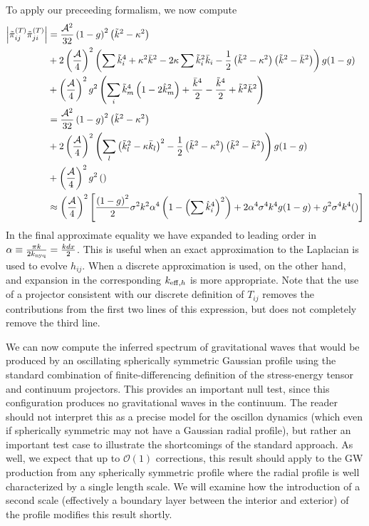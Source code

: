 \documentclass{revtex4}
\begin{document}
To apply our preceeding formalism, we now compute
\begin{align}
  \left|\tilde{\pi}^{(T)}_{ij}\tilde{\pi}_{ji}^{(T)}\right| &= \frac{\mathcal{A}^2}{32}\left(1-g\right)^2\left(\tilde{k}^2-\kappa^2\right) \notag \\
  &+ 2\left(\frac{\mathcal{A}}{4}\right)^2\left(\sum\tilde{k}_i^4 + \kappa^2\bar{k}^2 - 2\kappa\sum\tilde{k}_i^2\bar{k}_i - \frac{1}{2}\left(\tilde{k}^2-\kappa^2\right)\left(\tilde{k}^2-\bar{k}^2\right) \right)g(1-g) \\
  &+ \left(\frac{\mathcal{A}}{4}\right)^2g^2\left(\sum_i\tilde{k}_m^4\left(1-2\hat{k}_m^2\right) + \frac{\bar{k}^4}{2} - \frac{\tilde{k}^4}{2} + \tilde{k}^2\bar{k}^2\right) \notag \\
  &= \frac{\mathcal{A}^2}{32}\left(1-g\right)^2\left(\tilde{k}^2-\kappa^2\right) \notag \\
  &+ 2\left(\frac{\mathcal{A}}{4}\right)^2\left(\sum_l\left(\tilde{k}_l^2-\kappa\bar{k}_l\right)^2 - \frac{1}{2}\left(\tilde{k}^2-\kappa^2\right)\left(\tilde{k}^2-\bar{k}^2\right) \right)g(1-g) \notag \\
  &+ \left(\frac{\mathcal{A}}{4}\right)^2g^2\left(\right) \\
  &\approx \left(\frac{\mathcal{A}}{4}\right)^2\left[\frac{\left(1-g\right)^2}{2}\sigma^2k^2\alpha^4\left(1-\left(\sum\hat{k}_i^4\right)^2\right) + 2\alpha^4\sigma^4k^4g(1-g) + g^2\sigma^4k^4() \right]
\end{align}
In the final approximate equality we have expanded to leading order in $\alpha \equiv \frac{\pi k}{2k_{\rm nyq}} = \frac{kdx}{2}$.
This is useful when an exact approximation to the Laplacian is used to evolve $h_{ij}$.
When a discrete approximation is used, on the other hand, and expansion in the corresponding $k_{{\rm eff},h}$ is more appropriate. 
Note that the use of a projector consistent with our discrete definition of $T_{ij}$ removes the contributions from the first two lines of this expression, but does not completely remove the third line.

We can now compute the inferred spectrum of gravitational waves that would be produced by an oscillating spherically symmetric Gaussian profile using the standard combination of finite-differencing definition of the stress-energy tensor and continuum projectors.
This provides an important null test, since this configuration produces no gravitational waves in the continuum.
The reader should not interpret this as a precise model for the oscillon dynamics (which even if spherically symmetric may not have a Gaussian radial profile), but rather an important test case to illustrate the shortcomings of the standard approach.
As well, we expect that up to $\mathcal{O}(1)$ corrections, this result should apply to the GW production from any spherically symmetric profile where the radial profile is well characterized by a single length scale.
We will examine how the introduction of a second scale (effectively a boundary layer between the interior and exterior) of the profile modifies this result shortly.
\end{document}

